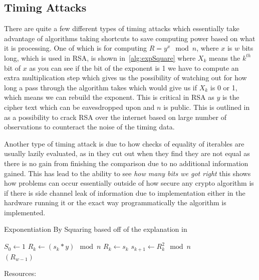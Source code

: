 \documentclass[a4paper,12pt]{article}
\begin{document}
\subsection{Timing Attacks}
There are quite a few different types of timing attacks which essentially take advantage of algorithms taking shortcuts to save computing power based on what it is processing. One of which is for computing $R = y^x \mod n$, where $x$ is $w$ bits long, which is used in RSA, is shown in~\ref{alg:expSquare} where $X_k$ means the $k^{th}$ bit of $x$ as you can see if the bit of the exponent is 1 we have to compute an extra multiplication step which gives us the possibility of watching out for how long a pass through the algorithm takes which would give us if $X_k$ is 0 or 1, which means we can rebuild the exponent. This is critical in RSA as $y$ is the cipher text which can be eavesdropped upon and $n$ is public. This is outlined in \cite{crosbyTiming} as a possibility to crack RSA over the internet based on large number of observations to counteract the noise of the timing data.

Another type of timing attack is due to how checks of equality of iterables are usually lazily evaluated, as in they cut out when they find they are not equal as there is no gain from finishing the comparison due to no additional information gained. This has lead to the ability to see \emph{how many bits we got right} \cite{lessonInTiming} this shows how problems can occur essentially outside of how secure any crypto algorithm is if there is side channel leak of information due to implementation either in the hardware running it or the exact way programmatically the algorithm is implemented.


\begin{algorithm}
    \caption{Exponentiation By Squaring based off of the explanation in \cite{kocherTiming}}
    \label{alg:expSquare}
\begin{algorithmic}
    \State $S_0 \gets 1$
        \State $R_k \gets (s_k * y) \mod n$
    \Else
        \State $R_k \gets s_k$
    \EndIf
    \State $s_{k+1} \gets R_k^2 \mod n$
    \EndFor\\
    \Return $(R_{w-1})$
\end{algorithmic}
\end{algorithm}




Resources:
\end{document}
